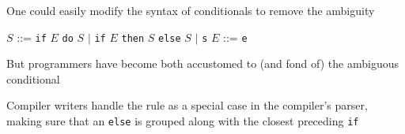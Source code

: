 \documentclass[8pt,a4paper,compress]{beamer}
\newcommand{\mm}[1]{$#1$}
\newenvironment{spaced}
{
\smallskip
\hspace{.5cm}
\begin{minipage}[c]{\textwidth}
}
{
\end{minipage}
\smallskip
}
\begin{document}
\begin{frame}[fragile]
\pause

One could easily modify the syntax of conditionals to remove the ambiguity

\text{ }
\begin{spaced}
\begin{production}
\mm{S} ::= \lstinline{if} \mm{E} \lstinline{do} \mm{S}
      \mm{|} \lstinline{if} \mm{E} \lstinline{then} \mm{S} \lstinline{else} \mm{S}
      \mm{|} \lstinline{s}
\mm{E} ::= \lstinline{e}
\end{production}
\end{spaced}

\pause
\bigskip

But programmers have become both accustomed to (and fond of) the ambiguous conditional

\pause
\bigskip

Compiler writers handle the rule as a special case in the compiler's parser, making sure that an \lstinline{else} is grouped along with the closest preceding \lstinline{if}
\end{frame}
\end{document}
